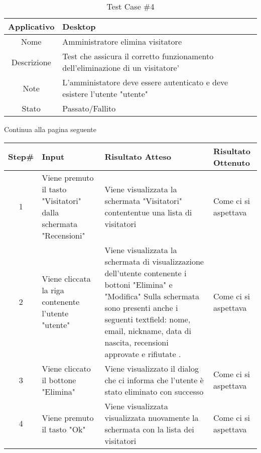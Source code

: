 
\begin{table}[H]
    \centering
    \footnotesize
    \caption{Test Case \#4}
    \begin{tabularx}{\textwidth}{|c|X|}
        \hline
        Applicativo & Desktop\\
        \hline
        Nome & Amministratore elimina visitatore  \\
        \hline
        Descrizione & Test che assicura il corretto funzionamento dell'eliminazione di un visitatore'\\
        \hline
        Note & L'amministatore deve essere autenticato e deve esistere l'utente "utente"  \\
        \hline
        Stato & Passato/Fallito\\
        \hline

    \end{tabularx}
    Continua alla pagina seguente
    \setlength{\tabcolsep}{8pt}
    \renewcommand{\arraystretch}{1.5}
\end{table}
\begin{table}[H]
    \footnotesize
    \begin{tabularx}{\textwidth}{|c|X|X|X|}
        \hline
        Step\# & Input & Risultato Atteso & Risultato Ottenuto \\
        \hline
         1 & Viene premuto il tasto "Visitatori" dalla schermata "Recensioni" 
         & Viene visualizzata la schermata "Visitatori" contententue una lista di visitatori
         &Come ci si aspettava\\
          \hline
        2 & Viene cliccata la riga contenente l'utente "utente"
        & Viene visualizzata la schermata di visualizzazione dell'utente contenente i bottoni "Elimina" e "Modifica"
          Sulla schermata sono presenti anche i seguenti textfield: nome, email, nickname, data di nascita, recensioni approvate e rifiutate .
        & Come ci si aspettava\\
         \hline 
        3 & Viene cliccato il bottone "Elimina"
         & Viene visualizzato il dialog che ci informa che l'utente è stato eliminato con successo
         & Come ci si aspettava\\
          \hline
          4 & Viene premuto il tasto "Ok"
         & Viene visualizzata visualizzata nuovamente la schermata con la lista dei visitatori
         & Come ci si aspettava\\
          \hline      
    \end{tabularx}
\end{table}
    
       
